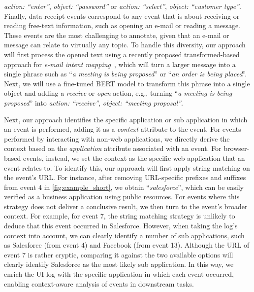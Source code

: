 \textit{action: ``enter''}, \textit{object: ``password''} or \textit{action: ``select''}, \textit{object: ``customer type''}.
%
 Finally, data receipt events correspond to any event that is about receiving or reading free-text information, such as opening an e-mail or reading a message. These events are the most challenging to annotate, given that an e-mail or message can relate to virtually any topic.
To handle this diversity, our approach will first process the opened text using a recently proposed transformed-based approach for \textit{e-mail intent mapping}~\cite{Khandaker2022transformer}, which will turn a larger message into a single phrase such as ``\textit{a meeting is being proposed}'' or ``\textit{an order is being placed}''. Next, we will use a fine-tuned BERT model to transform this phrase into a single object and adding a \textit{receive} or \textit{open} action, e.g., turning  ``\textit{a meeting is being proposed}'' into \textit{action: ``receive''}, \textit{object: ``meeting proposal''}.

 Next, our approach identifies the specific application or sub application in which an event is performed, adding it as a \textit{context} attribute to the event. 
For events performed by interacting with non-web applications, we directly derive the context based on the \textit{application} attribute associated with an event.
For browser-based events, instead, we set the context as the specific web application that an event relates to. To identify this, our approach will first apply string matching on the event's URL. For instance, 
after removing URL-specific prefixes and suffixes from event 4 in \autoref{fig:example_short}, we obtain ``\textit{salesforce}'', which can be easily verified as a business application using public resources. 
For events where this strategy does not deliver a conclusive result, we then turn to the event's broader context. For example, for event 7, the string matching strategy is unlikely to deduce that this event occurred in Salesforce. However, when taking the log's context into account, we can clearly identify a number of sub applications, such as Salesforce (from event 4) and Facebook (from event 13). Although the URL of event 7 is rather cryptic, comparing it against the two available options will clearly identify Salesforce as the most likely sub application. In this way, we enrich the UI log with the specific application in which each event occurred, enabling context-aware analysis of events in downstream tasks.



